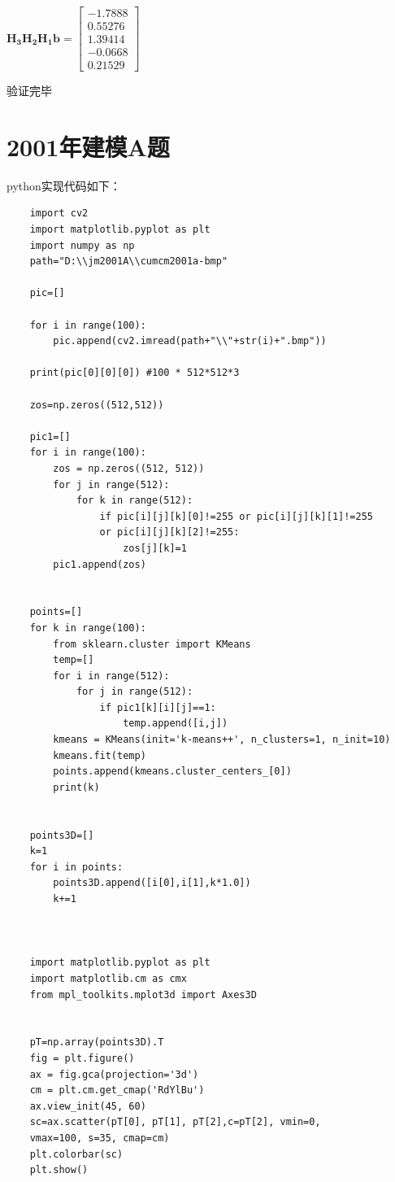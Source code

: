 \documentclass[UTF8]{ctexart}
\begin{document}
$\mathbf{H_3H_2H_1b}=\left[\begin{array}{cccccc}
									{-1.7888}\\
{0.55276}\\
{1.39414}\\
{-0.0668}\\
{0.21529}
									 \end{array}\right]$

验证完毕

\newpage
\section{2001年建模A题}
python实现代码如下：
\begin{lstlisting}
	import cv2
	import matplotlib.pyplot as plt
	import numpy as np
	path="D:\\jm2001A\\cumcm2001a-bmp"

	pic=[]

	for i in range(100):
	    pic.append(cv2.imread(path+"\\"+str(i)+".bmp"))

	print(pic[0][0][0]) #100 * 512*512*3

	zos=np.zeros((512,512))

	pic1=[]
	for i in range(100):
	    zos = np.zeros((512, 512))
	    for j in range(512):
	        for k in range(512):
	            if pic[i][j][k][0]!=255 or pic[i][j][k][1]!=255 
	            or pic[i][j][k][2]!=255:
	                zos[j][k]=1
	    pic1.append(zos)


	points=[]
	for k in range(100):
	    from sklearn.cluster import KMeans
	    temp=[]
	    for i in range(512):
	        for j in range(512):
	            if pic1[k][i][j]==1:
	                temp.append([i,j])
	    kmeans = KMeans(init='k-means++', n_clusters=1, n_init=10)
	    kmeans.fit(temp)
	    points.append(kmeans.cluster_centers_[0])
	    print(k)


	points3D=[]
	k=1
	for i in points:
	    points3D.append([i[0],i[1],k*1.0])
	    k+=1



	import matplotlib.pyplot as plt
	import matplotlib.cm as cmx
	from mpl_toolkits.mplot3d import Axes3D


	pT=np.array(points3D).T
	fig = plt.figure()
	ax = fig.gca(projection='3d') 
	cm = plt.cm.get_cmap('RdYlBu')
	ax.view_init(45, 60)
	sc=ax.scatter(pT[0], pT[1], pT[2],c=pT[2], vmin=0, 
	vmax=100, s=35, cmap=cm)
	plt.colorbar(sc)
	plt.show()



\end{lstlisting}
\end{document}
